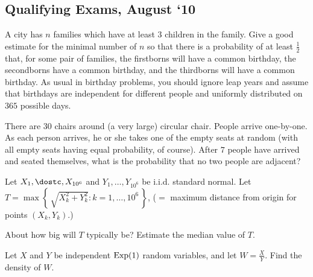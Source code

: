 \subsection{Qualifying Exams, August `10}
\begin{problem}
  A city has \(n\) families which have at least \(3\) children in the
  family. Give a good estimate for the minimal number of \(n\) so that
  there is a probability of at least \(\frac{1}{2}\) that, for some pair of
  families, the firstborns will have a common birthday, the secondborns
  have a common birthday, and the thirdborns will have a common
  birthday. As usual in birthday problems, you should ignore leap years and
  assume that birthdays are independent for different people and uniformly
  distributed on \(365\) possible days.
\end{problem}
\begin{solution*}
\end{solution*}

\begin{problem}
  There are \(30\) chairs around (a very large) circular chair. People
  arrive one-by-one. As each person arrives, he or she takes one of the
  empty seats at random (with all empty seats having equal probability, of
  course). After \(7\) people have arrived and seated themselves, what is
  the probability that no two people are adjacent?
\end{problem}
\begin{solution*}
\end{solution*}

\begin{problem}
  Let \(X_1,\dostc,X_{10^6}\) and \(Y_1,\dotsc,Y_{10^6}\) be i.i.d.\@
  standard normal. Let
  \(T=\max\left\{\,\sqrt{X_k^2+Y_k^2}:k=1,\dotsc,10^6\,\right\}\), (\(=\)
  maximum distance from origin for points \((X_k,Y_k)\).)

  \noindent About how big will \(T\) typically be? Estimate the median
  value of \(T\).
\end{problem}
\begin{solution*}
\end{solution*}

\begin{problem}
  Let \(X\) and \(Y\) be independent \(\operatorname{Exp}(1)\) random variables, and let
  \(W=\frac{X}{Y}\). Find the density of \(W\).
\end{problem}
\begin{solution*}
\end{solution*}

